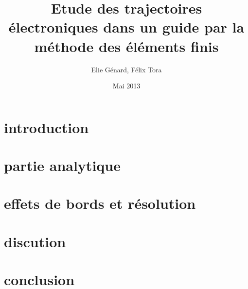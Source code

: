 \documentclass[a4paper,12pt]{article}
\title{Etude des trajectoires électroniques dans un guide par la méthode des éléments finis}
\author{Elie Génard, Félix Tora}
\date{Mai 2013}
\begin{document}
\maketitle

\section{introduction}


\section{partie analytique}


\section{effets de bords et résolution}


\section{discution}



\section{conclusion}
\end{document}
